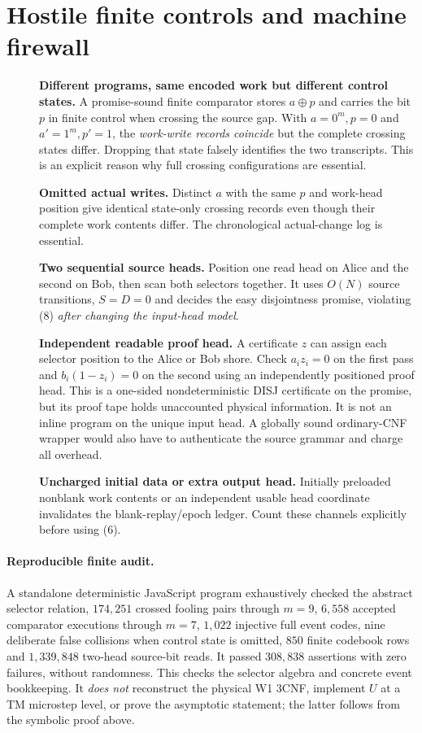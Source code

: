 \documentclass[11pt]{article}
\begin{document}
\section{Hostile finite controls and machine firewall}
\begin{description}
\item[] \textbf{Different programs, same encoded work but different
control states.} A promise-sound finite comparator stores
$a\oplus p$ and carries the bit $p$ in finite control when
crossing the source gap.  With $a=0^m,p=0$ and
$a'=1^m,p'=1$, the \emph{work-write records coincide} but
the complete crossing states differ. Dropping that state
falsely identifies the two transcripts. This is an explicit
reason why full crossing configurations are essential.
\item[] \textbf{Omitted actual writes.}  Distinct $a$ with the same
$p$ and work-head position give identical state-only
crossing records even though their complete work contents
differ.  The chronological actual-change log is essential.
\item[] \textbf{Two sequential source heads.} Position one read
head on Alice and the second on Bob, then scan both
selectors together. It uses $O(N)$ source transitions,
$S=D=0$ and decides the easy disjointness promise,
violating (8) \emph{after changing the input-head model}.
\item[] \textbf{Independent readable proof head.} A certificate
$z$ can assign each selector position to the Alice or Bob
shore. Check $a_i z_i=0$ on the first pass and
$b_i(1-z_i)=0$ on the second using an independently
positioned proof head. This is a one-sided nondeterministic
DISJ certificate on the promise, but its proof tape holds
unaccounted physical information. It is not an inline
program on the unique input head. A globally sound
ordinary-CNF wrapper would also have to authenticate the
source grammar and charge all overhead.
\item[] \textbf{Uncharged initial data or extra output head.}
Initially preloaded nonblank work contents or an independent
usable head coordinate invalidates the blank-replay/epoch
ledger. Count these channels explicitly before using (6).
\end{description}

\paragraph{Reproducible finite audit.}
A standalone deterministic JavaScript program exhaustively checked
the abstract selector relation, $174{,}251$ crossed fooling pairs
through $m=9$, $6{,}558$ accepted comparator executions
through $m=7$, $1{,}022$ injective full event codes, nine
deliberate false collisions when control state is omitted,
$850$ finite codebook rows and $1{,}339{,}848$
two-head source-bit reads. It passed
$308{,}838$ assertions with zero failures, without randomness.
This checks the selector algebra and concrete event bookkeeping.
It \emph{does not} reconstruct the physical W1 3CNF, implement
$U$ at a TM microstep level, or prove the asymptotic statement;
the latter follows from the symbolic proof above.
\end{document}
